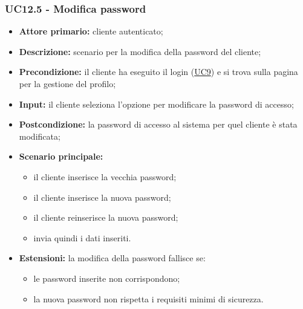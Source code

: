 \subsubsection{UC12.5 - Modifica password}
\label{UC12.5}
\begin{itemize}
    \item \textbf{Attore primario:} cliente autenticato;
    \item \textbf{Descrizione:} scenario per la modifica della password del cliente;
    \item \textbf{Precondizione:} il cliente ha eseguito il login (\hyperref[UC9]{UC9}) e si trova sulla pagina per la gestione del profilo;
    \item \textbf{Input:} il cliente seleziona l'opzione per modificare la password di accesso;
    \item \textbf{Postcondizione:} la password di accesso al sistema per quel cliente è stata modificata;
    \item \textbf{Scenario principale:}
    \begin{itemize}
        \item il cliente inserisce la vecchia password;
        \item il cliente inserisce la nuova password;
        \item il cliente reinserisce la nuova password;
        \item invia quindi i dati inseriti.
    \end{itemize}
    \item \textbf{Estensioni:} la modifica della password fallisce se:
    \begin{itemize}
        \item le password inserite non corrispondono;
        \item la nuova password non rispetta i requisiti minimi di sicurezza.
    \end{itemize}
\end{itemize}

